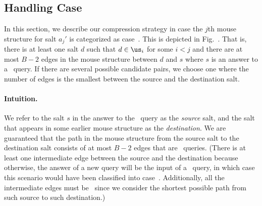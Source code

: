   

\subsection{Handling Case~}
\label{sec:somerep}
\ifnum{}
\fammousefig
\fi
In this section, we describe our compression strategy in case the $j$th mouse structure for salt $a_j'$ is categorized as case~. \ifnum{} This is depicted in Fig.~. \fi
That is, there is at least one salt $d$ such that $d\in \us_i$ for some $i<j$ and there are at most $B-2$ edges in the mouse structure between $d$ and $s$ where $s$ is an answer to a \new\ query. If there are several possible candidate pairs, we choose one where the number of edges is the smallest between the source and the destination salt.



\paragraph{Intuition.} We refer to the salt $s$ in the answer to the \new\ query as the \emph{source} salt, and the salt that appears in some earlier mouse structure as the \emph{destination}. We are guaranteed that the path in the mouse structure from the source salt to the destination salt consists of at most $B-2$ edges that are \urep\ queries. (There is at least one intermediate edge between the source and the destination because otherwise, the answer of a new query will be the input of a \frep\ query,  in which case this scenario would have been classified into case~. Additionally, all the intermediate edges must be \urep\ since we consider the shortest possible path from such source to such destination.) 


